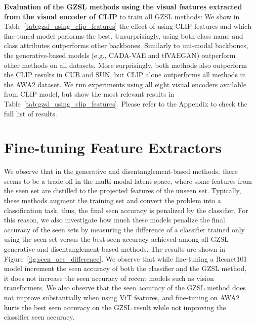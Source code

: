 \textbf{Evaluation of the GZSL methods using the visual features extracted from the visual encoder of CLIP}
to train all GZSL methods: We show in Table~\ref{tab:gzsl_using_clip_features} the effect of using CLIP features and which fine-tuned model performs the best. Unsurprisingly, using both class name and class attributes outperforms other backbones. Similarly to uni-modal backbones, the generative-based models (e.g., CADA-VAE and tfVAEGAN) outperform other methods on all datasets. More surprisingly, both methods also outperform the CLIP results in CUB and SUN, but CLIP alone outperforms all methods in the AWA2 dataset. 
We run experiments using all eight visual encoders available from CLIP model, but show the most relevant results in Table~\ref{tab:gzsl_using_clip_features}. Please refer to the Appendix to check the full list of results.




\section{Fine-tuning Feature Extractors}


 
We observe that in the generative and disentanglement-based methods, there seems to be a trade-off in the multi-modal latent space, where some features from the seen set are distilled to the projected features of the unseen set. Typically, these methods augment the training set and convert the problem into a classification task, thus, the final seen accuracy is penalized by the classifier. 
For this reason, we also investigate how much these models penalize the final accuracy of the seen sets by measuring the difference of a classifier trained only using the seen set versus the best-seen accuracy achieved among all GZSL generative and disentanglement-based methods. 
The results are shown in Figure~\ref{fig:seen_acc_difference}. 
We observe that while fine-tuning a Resnet101 model increment the seen accuracy of both the classifier and the GZSL method, it does not increase the seen accuracy of recent models such as vision transformers. 
We also observe that the seen accuracy of the GZSL method does not improve substantially when using ViT features, 
and fine-tuning on AWA2 hurts the best seen accuracy on the GZSL result while not improving the classifier seen accuracy. 


